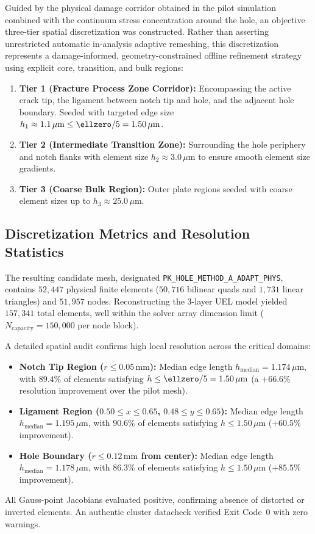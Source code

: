 Guided by the physical damage corridor obtained in the pilot simulation combined with the continuum stress concentration around the hole, an objective three-tier spatial discretization was constructed. Rather than asserting unrestricted automatic in-analysis adaptive remeshing, this discretization represents a damage-informed, geometry-constrained offline refinement strategy using explicit core, transition, and bulk regions:
\begin{enumerate}
  \item \textbf{Tier 1 (Fracture Process Zone Corridor):} Encompassing the active crack tip, the ligament between notch tip and hole, and the adjacent hole boundary. Seeded with targeted edge size $h_1 \approx 1.1\,\mu\mathrm{m} \le \ellzero / 5 = 1.50\,\mu\mathrm{m}$.
  \item \textbf{Tier 2 (Intermediate Transition Zone):} Surrounding the hole periphery and notch flanks with element size $h_2 \approx 3.0\,\mu\mathrm{m}$ to ensure smooth element size gradients.
  \item \textbf{Tier 3 (Coarse Bulk Region):} Outer plate regions seeded with coarse element sizes up to $h_3 \approx 25.0\,\mu\mathrm{m}$.
\end{enumerate}

\subsection{Discretization Metrics and Resolution Statistics}
\label{subsec:mesh_metrics}

The resulting candidate mesh, designated \texttt{PK\_HOLE\_METHOD\_A\_ADAPT\_PHYS}, contains $52{,}447$ physical finite elements ($50{,}716$ bilinear quads and $1{,}731$ linear triangles) and $51{,}957$ nodes. Reconstructing the 3-layer UEL model yielded $157{,}341$ total elements, well within the solver array dimension limit ($N_{\mathrm{capacity}} = 150{,}000$ per node block).

A detailed spatial audit confirms high local resolution across the critical domains:
\begin{itemize}
  \item \textbf{Notch Tip Region ($r \le 0.05\,\mathrm{mm}$):} Median edge length $h_{\mathrm{median}} = 1.174\,\mu\mathrm{m}$, with $89.4\%$ of elements satisfying $h \le \ellzero / 5 = 1.50\,\mu\mathrm{m}$ (a $+66.6\%$ resolution improvement over the pilot mesh).
  \item \textbf{Ligament Region ($0.50 \le x \le 0.65$, $0.48 \le y \le 0.65$):} Median edge length $h_{\mathrm{median}} = 1.195\,\mu\mathrm{m}$, with $90.6\%$ of elements satisfying $h \le 1.50\,\mu\mathrm{m}$ ($+60.5\%$ improvement).
  \item \textbf{Hole Boundary ($r \le 0.12\,\mathrm{mm}$ from center):} Median edge length $h_{\mathrm{median}} = 1.178\,\mu\mathrm{m}$, with $86.3\%$ of elements satisfying $h \le 1.50\,\mu\mathrm{m}$ ($+85.5\%$ improvement).
\end{itemize}
All Gauss-point Jacobians evaluated positive, confirming absence of distorted or inverted elements. An authentic cluster datacheck verified Exit Code~0 with zero warnings.

